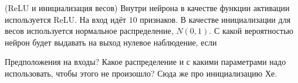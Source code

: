 \begin{problem}{(ReLU и инициализация весов)}
    Внутри нейрона в качестве функции активации используется ReLU. На вход идёт $10$ признаков. В качестве инициализации для весов используется нормальное распределение, $N(0,1)$. С какой вероятностью нейрон будет выдавать на выход нулевое наблюдение, если 
    
    Предположения на входы? Какое распределение и с какими параметрами надо использовать, чтобы этого не произошло? Сюда же про инициализацию Хе.
\end{problem}






